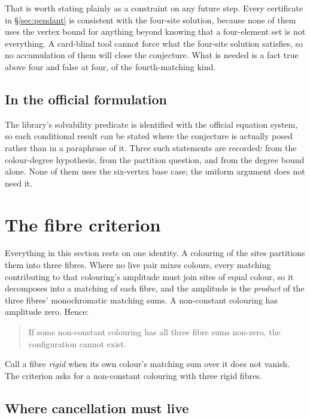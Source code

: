 \documentclass[11pt]{article}
\theoremstyle{definition}
\theoremstyle{remark}
\begin{document}
That is worth stating plainly as a constraint on any future step. Every certificate in
\S\ref{sec:pendant} is consistent with the four-site solution, because none of them uses the
vertex bound for anything beyond knowing that a four-element set is not everything. A card-blind
tool cannot force what the four-site solution satisfies, so no accumulation of them will close the
conjecture. What is needed is a fact true above four and false at four, of the fourth-matching
kind.

\subsection*{In the official formulation}

The library's solvability predicate is identified with the official equation system, so each
conditional result can be stated where the conjecture is actually posed rather than in a
paraphrase of it. Three such statements are recorded: from the colour-degree hypothesis, from the
partition question, and from the degree bound alone. None of them uses the six-vertex base case;
the uniform argument does not need it.

\section{The fibre criterion}\label{sec:fibre}

Everything in this section rests on one identity.  A colouring of the sites partitions them into
three fibres.  Where no live pair mixes colours, every matching contributing to that colouring's
amplitude must join sites of equal colour, so it decomposes into a matching of each fibre, and the
amplitude is the \emph{product} of the three fibres' monochromatic matching sums.  A non-constant
colouring has amplitude zero.  Hence:

\begin{quote}
If some non-constant colouring has all three fibre sums non-zero, the configuration cannot exist.
\end{quote}

Call a fibre \emph{rigid} when its own colour's matching sum over it does not vanish.  The criterion
asks for a non-constant colouring with three rigid fibres.

\subsection*{Where cancellation must live}
\end{document}

